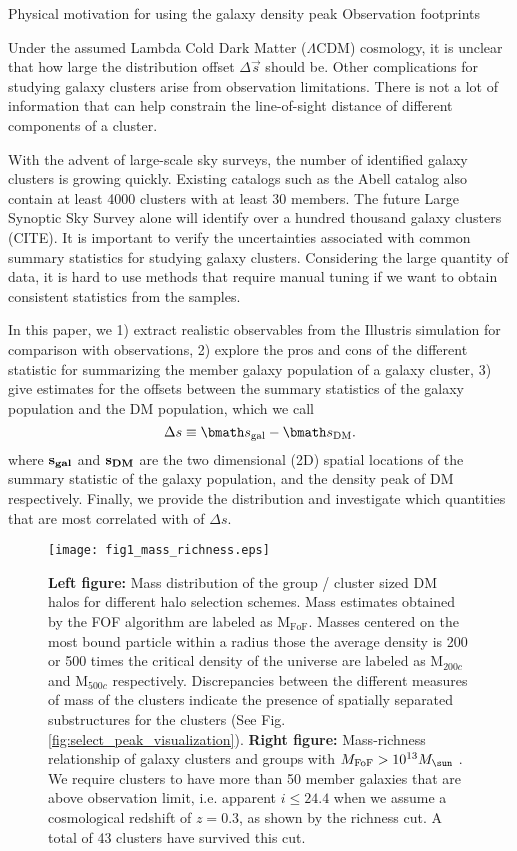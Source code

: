 Physical motivation for using the galaxy density peak 
Observation footprints 

Under the assumed Lambda Cold Dark Matter ($\Lambda$CDM) cosmology, it is unclear 
that how large the distribution offset $\Delta \vec{s}$ should be. 
Other complications for studying galaxy clusters arise from observation
limitations. There is not a lot of information that can help constrain the  
line-of-sight distance of different components of a cluster. 


With the advent of large-scale sky surveys, 
the number of identified galaxy clusters is growing quickly. 
Existing catalogs such as the Abell catalog also contain
at least 4000 clusters with at least 30 members. 
The future Large Synoptic Sky Survey alone will identify over a hundred thousand galaxy
clusters (CITE). It is important to verify the uncertainties associated with common
summary statistics for studying galaxy clusters. Considering the large quantity
of data, it is hard to use methods that require manual tuning if we want to
obtain consistent statistics from the samples.

In this paper, we 
1) extract realistic observables from the Illustris simulation for
comparison with observations, 2) explore the pros and cons of the different statistic for 
summarizing the member galaxy population of a galaxy cluster, 3)	
give estimates for the offsets between the summary statistics of the galaxy  
population and the DM population, which we call 
\begin{equation}
	\Delta s \equiv \vec{s}_{\rm gal} - \vec{s}_{\rm DM}.
\end{equation}
where $\bf{s}_{gal}$ and $\bf{s}_{DM}$ are the two dimensional (2D) spatial
locations of the summary statistic of the galaxy population, and the density
peak of DM respectively. 
Finally, we provide the distribution and investigate which quantities that are most
correlated with of $\Delta s$.

\begin{figure*}
	\texttt{[image: fig1\_mass\_richness.eps]}
	\caption{ {\bf Left figure:} Mass distribution of the group / cluster sized 
		DM halos for different halo selection schemes. Mass estimates obtained by the
		FOF algorithm are labeled as  M$_{\text{FoF}}$.
		Masses centered on the most bound particle within a radius those the 
		average density is 200 or 500 times the critical density of the universe are 
		labeled as M$_{200c}$ and M$_{500c}$ respectively. 
		Discrepancies between the different
		measures of mass of the clusters indicate the presence of spatially
		separated substructures for the clusters (See Fig. 
		\ref{fig:select_peak_visualization}). {\bf Right figure:} 
		Mass-richness relationship of galaxy clusters and groups with 
		$M_{\rm FoF} > 10^{13} M_{\sun}$ . We require clusters to have more than 50 member 
		galaxies that are above observation limit, i.e. apparent $i \leq 24.4$ when 
		we assume a cosmological redshift
of $z=0.3$, as shown by the richness cut. A total of 43 clusters have 
survived this cut. \label{fig:mass_richness}}
\end{figure*}

